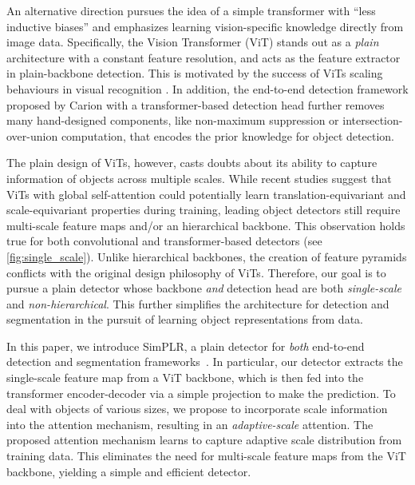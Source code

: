 An alternative direction pursues the idea of a simple transformer with ``less inductive biases'' and emphasizes learning vision-specific knowledge directly from image data. 
Specifically, the Vision Transformer (ViT) \cite{dosovitskiy2021vit} stands out as a \emph{plain} architecture with a constant feature resolution, and acts as the feature extractor in plain-backbone detection. This is motivated by the success of ViTs scaling behaviours in visual recognition \cite{he2022mae,bao2022beit,dehghani2023scalingvit22b}. In addition, the end-to-end detection framework proposed by Carion \etal \cite{nicolas2020detr} with a transformer-based detection head further removes many hand-designed components, like non-maximum suppression or intersection-over-union computation, that encodes the prior knowledge for object detection. 

The plain design of ViTs, however, casts doubts about its ability to capture information of objects across multiple scales. While recent studies \cite{dosovitskiy2021vit,li2022vitdet} suggest that ViTs with global self-attention could potentially learn translation-equivariant and scale-equivariant properties during training, leading object detectors still require multi-scale feature maps and/or an hierarchical backbone. This observation holds true for both convolutional \cite{ren2015faster_rcnn,he2017maskrcnn,li2022vitdet} and transformer-based detectors \cite{zhu2021deformable,nguyen2022boxer,cheng2022mask2former} (see \cref{fig:single_scale}). Unlike hierarchical backbones, the creation of feature pyramids conflicts with the original design philosophy of ViTs. Therefore, our goal is to pursue a plain detector whose backbone \textit{and} detection head are both \textit{single-scale} and \textit{non-hierarchical}. This further simplifies the architecture for detection and segmentation in the pursuit of learning object representations from data.

In this paper, we introduce SimPLR, a plain detector for \textit{both} end-to-end detection and segmentation frameworks~\cite{nicolas2020detr,zhu2021deformable,nguyen2022boxer,cheng2022mask2former}. In particular, our detector extracts the single-scale feature map from a ViT backbone, which is then fed into the transformer encoder-decoder via a simple projection to make the prediction. To deal with objects of various sizes, we propose to incorporate scale information into the attention mechanism, resulting in an \emph{adaptive-scale} attention. The proposed attention mechanism learns to capture adaptive scale distribution from training data. This eliminates the need for multi-scale feature maps from the ViT backbone, yielding a simple and efficient detector.

